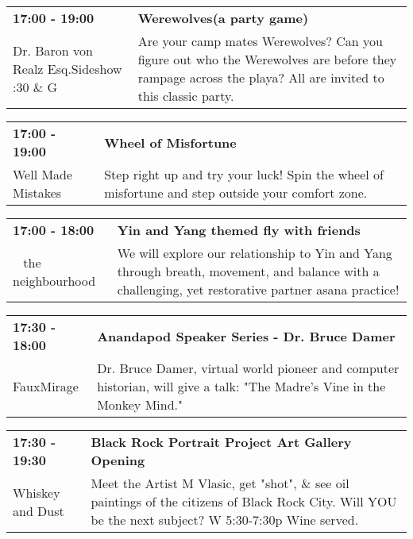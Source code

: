 \begin{tabular}{ p{1in} p{2.2in} }
    \textbf{17:00 - 19:00} & \textbf{Werewolves(a party game)} \\
    Dr. Baron von Realz Esq.Sideshow \newline 4:30 \& G & Are your camp mates Werewolves? Can you figure out who the Werewolves are before they rampage across the playa? All are invited to this classic party. \\
    \hline 
\end{tabular}
    
\begin{tabular}{ p{1in} p{2.2in} }
    \textbf{17:00 - 19:00} & \textbf{Wheel of Misfortune} \\
    Well Made Mistakes \newline  & Step right up and try your luck! Spin the wheel of misfortune and step outside your comfort zone. \\
    \hline 
\end{tabular}
    
\begin{tabular}{ p{1in} p{2.2in} }
    \textbf{17:00 - 18:00} & \textbf{Yin and Yang themed fly with friends} \\
    ~ \newline the neighbourhood & We will explore our relationship to Yin and Yang through breath, movement, and balance with a challenging, yet restorative partner asana practice! \\
    \hline 
\end{tabular}
    
\begin{tabular}{ p{1in} p{2.2in} }
    \textbf{17:30 - 18:00} & \textbf{Anandapod Speaker Series - Dr. Bruce Damer} \\
    FauxMirage \newline  & Dr. Bruce Damer, virtual world pioneer and computer historian, will give a talk: "The Madre's Vine in the Monkey Mind." \\
    \hline 
\end{tabular}
    
\begin{tabular}{ p{1in} p{2.2in} }
    \textbf{17:30 - 19:30} & \textbf{Black Rock Portrait Project Art Gallery Opening} \\
    Whiskey and Dust \newline  & Meet the Artist M Vlasic, get "shot", \& see oil paintings of the citizens of Black Rock City. Will YOU be the next subject? W 5:30-7:30p Wine served. \\
    \hline 
\end{tabular}
    
